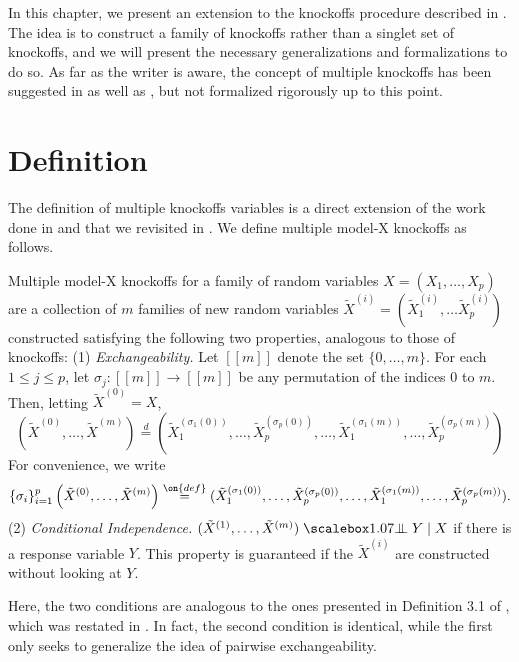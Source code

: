 
\label{chapter3}
In this chapter, we present an extension to the knockoffs procedure described in . The idea is to construct a family of knockoffs rather than a singlet set of knockoffs, and we will present the necessary generalizations and formalizations to do so. As far as the writer is aware, the concept of multiple knockoffs has been suggested in \cite{knockoffs} as well as \cite{panning}, but not formalized rigorously up to this point.
\section{Definition}
The definition of multiple knockoffs variables is a direct extension of the work done in \cite{knockoffs} and \cite{panning} that we revisited in . We define multiple model-X knockoffs as follows.
\begin{defn}
Multiple model-X knockoffs for a family of random variables $X = (X_1, \ldots, X_p)$ are a collection of $m$ families of new random variables $\tilde{X}^{(i)} = (\tilde{X}^{(i)}_1, \ldots \tilde{X}^{(i)}_p)$ constructed satisfying the following two properties, analogous to those of knockoffs: (1) \emph{Exchangeability.} Let $[[m]]$ denote the set $\{ 0, \ldots, m \}$. For each $1 \leq j \leq p$, let $\sigma_j : [[m]] \to [[m]]$ be any permutation of the indices $0$ to $m$. Then, letting $\tilde{X}^{(0)} = X$,
\begin{equation}
(\tilde{X}^{(0)}, \ldots, \tilde{X}^{(m)}) \overset{d}= (\tilde{X}^{(\sigma_1(0))}_{1}, \ldots, \tilde{X}^{(\sigma_p(0))}_{p}, \ldots, \tilde{X}^{(\sigma_1(m))}_{1}, \ldots, \tilde{X}^{(\sigma_p(m))}_{p}  )
\end{equation}
For convenience, we write
\begin{equation}
\{ \sigma_i \}_{i=1}^p \left( \tilde{X}^{(0)}, \ldots, \tilde{X}^{(m)} \right) \overset{\on{def}}{=} (\tilde{X}^{(\sigma_1(0))}_{1}, \ldots, \tilde{X}^{(\sigma_p(0))}_{p}, \ldots, \tilde{X}^{(\sigma_1(m))}_{1}, \ldots, \tilde{X}^{(\sigma_p(m))}_{p}  ).
\end{equation}
(2) \emph{Conditional Independence.} $(\tilde{X}^{(1)}, \ldots, \tilde{X}^{(m)}) \indep Y \mid X$ if there is a response variable $Y$. This property is guaranteed if the $\tilde{X}^{(i)}$ are constructed without looking at $Y$.
\end{defn}
Here, the two conditions are analogous to the ones presented in Definition 3.1 of \cite{panning}, which was restated in . In fact, the second condition is identical, while the first only seeks to generalize the idea of pairwise exchangeability.

